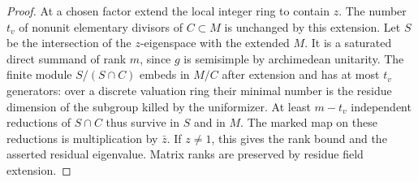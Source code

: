 \documentclass[a4paper,11pt]{article}
\theoremstyle{definition}
\theoremstyle{remark}
\numberwithin{equation}{section}
\begin{document}
\begin{proof}
At a chosen factor extend the local integer ring to contain \(z\).
The number \(t_v\) of nonunit elementary divisors of \(C\subset M\)
is unchanged by this extension. Let \(S\) be the intersection of
the \(z\)-eigenspace with the extended \(M\). It is a saturated
direct summand of rank \(m\), since \(g\) is semisimple by
archimedean unitarity. The finite module \(S/(S\cap C)\) embeds
in \(M/C\) after extension and has at most \(t_v\) generators:
over a discrete valuation ring their minimal number is the
residue dimension of the subgroup killed by the uniformizer.
At least \(m-t_v\) independent reductions of \(S\cap C\) thus
survive in \(S\) and in \(M\). The marked map on these reductions
is multiplication by \(\bar z\). If \(z\ne1\), this gives the rank
bound and the asserted residual eigenvalue. Matrix ranks are
preserved by residue field extension.
\end{proof}
\end{document}
